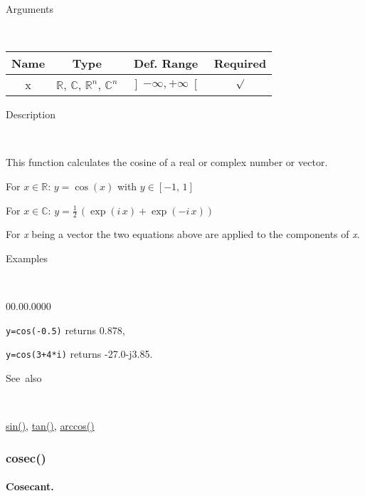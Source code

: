\begin{description}
\item [Arguments]~
\end{description}
\begin{tabular}{|c|c|c|c|}
\hline 
Name&
Type&
Def. Range&
Required\tabularnewline
\hline
\hline 
x&
$\mathbb{R}$, $\mathbb{C}$, $\mathbb{R}^{n}$, $\mathbb{C}^{n}$&
$\left]-\infty,+\infty\right[$&
$\surd$\tabularnewline
\hline
\end{tabular}

\begin{description}
\item [Description]~
\end{description}
This function calculates the cosine of a real or complex number or
vector.

\medskip{}
For $x\in\mathbb{R}$: $y=\cos\left(x\right)$ with $y\in\left[-1,\,1\right]$

\medskip{}
For $x\in\mathbb{C}$: $y=\frac{1}{2}\,\left(\exp\left(i\, x\right)+\exp\left(-i\, x\right)\right)$
\medskip{}

For \textit{x} being a vector the two equations above are
applied to the components of \textit{x}.

\begin{description}
\item [Examples]~
\end{description}
\begin{lyxlist}{00.00.0000}
\item [\texttt{y=cos(-0.5)}]returns 0.878,
\item [\texttt{y=cos(3+4{*}i)}]returns -27.0-j3.85.
\end{lyxlist}
\begin{description}
\item [See~also]~
\end{description}
\textcolor{blue}{\hyperlink{sin}{sin()}}\textcolor{black}{,} \textcolor{blue}{\hyperlink{tan}{tan()}}\textcolor{black}{,}
\textcolor{blue}{\hyperlink{arccos}{arccos()}}


\newpage
\subsubsection*{\hypertarget{cosec}{}{\Large cosec()}}


\paragraph{\label{par:Cosecant}Cosecant.}

